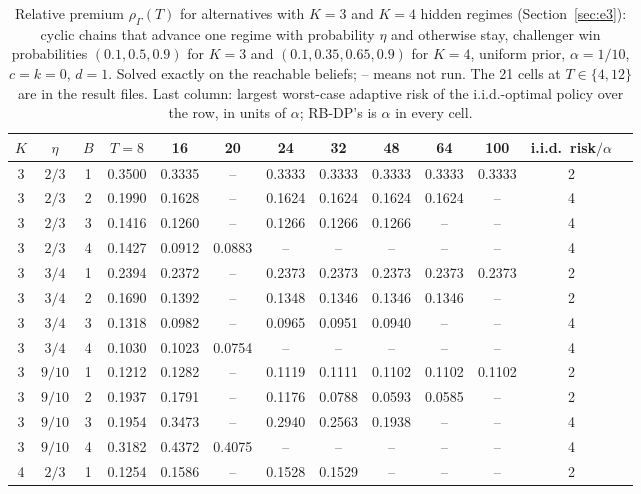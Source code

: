 \documentclass{article}
\theoremstyle{plain}
\theoremstyle{definition}
\theoremstyle{remark}
\newcommand{\rhoG}{\rho_\Gamma}
\begin{document}
\begin{table}[h]
\centering
\caption{Relative premium $\rhoG(T)$ for alternatives with $K=3$ and $K=4$ hidden regimes (Section~\ref{sec:e3}): cyclic chains that advance one regime with probability $\eta$ and otherwise stay, challenger win probabilities $(0.1,0.5,0.9)$ for $K=3$ and $(0.1,0.35,0.65,0.9)$ for $K=4$, uniform prior, $\alpha=1/10$, $c=k=0$, $d=1$. Solved exactly on the reachable beliefs; -- means not run. The 21 cells at $T\in\{4,12\}$ are in the result files. Last column: largest worst-case adaptive risk of the i.i.d.-optimal policy over the row, in units of $\alpha$; RB-DP's is $\alpha$ in every cell.}
\label{tab:kstate}
\small
\begin{tabular}{ccccccccccccc}
\toprule
$K$ & $\eta$ & $B$ & $T=8$ & 16 & 20 & 24 & 32 & 48 & 64 & 100 & i.i.d.\ risk$/\alpha$\\
\midrule
3 & $2/3$ & 1 & 0.3500 & 0.3335 & -- & 0.3333 & 0.3333 & 0.3333 & 0.3333 & 0.3333 & 2\\
3 & $2/3$ & 2 & 0.1990 & 0.1628 & -- & 0.1624 & 0.1624 & 0.1624 & 0.1624 & -- & 4\\
3 & $2/3$ & 3 & 0.1416 & 0.1260 & -- & 0.1266 & 0.1266 & 0.1266 & -- & -- & 4\\
3 & $2/3$ & 4 & 0.1427 & 0.0912 & 0.0883 & -- & -- & -- & -- & -- & 4\\
3 & $3/4$ & 1 & 0.2394 & 0.2372 & -- & 0.2373 & 0.2373 & 0.2373 & 0.2373 & 0.2373 & 2\\
3 & $3/4$ & 2 & 0.1690 & 0.1392 & -- & 0.1348 & 0.1346 & 0.1346 & 0.1346 & -- & 2\\
3 & $3/4$ & 3 & 0.1318 & 0.0982 & -- & 0.0965 & 0.0951 & 0.0940 & -- & -- & 4\\
3 & $3/4$ & 4 & 0.1030 & 0.1023 & 0.0754 & -- & -- & -- & -- & -- & 4\\
3 & $9/10$ & 1 & 0.1212 & 0.1282 & -- & 0.1119 & 0.1111 & 0.1102 & 0.1102 & 0.1102 & 2\\
3 & $9/10$ & 2 & 0.1937 & 0.1791 & -- & 0.1176 & 0.0788 & 0.0593 & 0.0585 & -- & 2\\
3 & $9/10$ & 3 & 0.1954 & 0.3473 & -- & 0.2940 & 0.2563 & 0.1938 & -- & -- & 4\\
3 & $9/10$ & 4 & 0.3182 & 0.4372 & 0.4075 & -- & -- & -- & -- & -- & 4\\
\midrule
4 & $2/3$ & 1 & 0.1254 & 0.1586 & -- & 0.1528 & 0.1529 & -- & -- & -- & 2\\

\end{tabular}
\end{table}
\end{document}
